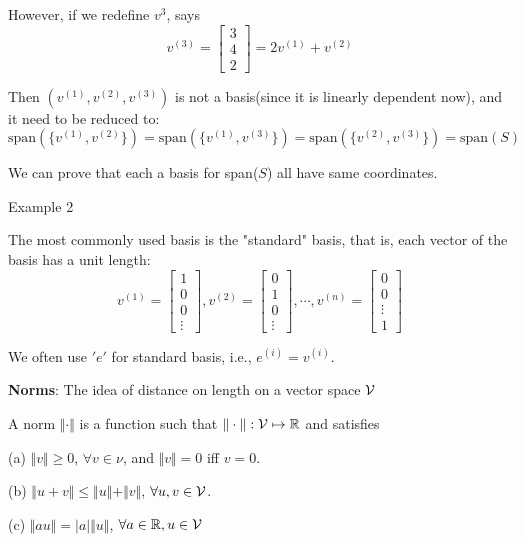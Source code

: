 However, if we redefine $v^{3}$, says
$$v^{(3)}= 
\left[ 
\begin{array}{c} 
3 \\
4 \\
2
\end{array}
\right]
=2v^{(1)}+v^{(2)}$$

Then $\left(v^{(1)},v^{(2)}, v^{(3)}\right)$ is not a basis(since it is linearly dependent now), and it need to be reduced to:
$$\text{span}\left(\{v^{(1)},v^{(2)}\}\right)=\text{span}\left(\{v^{(1)},v^{(3)}\}\right)=\text{span}\left(\{v^{(2)},v^{(3)}\}\right)=\text{span}(S)$$

We can prove that each a basis for span($S$) all have same coordinates.

\vspace{0.3cm}
Example 2

The most commonly used basis is the "standard" basis, that is, each vector of the basis has a unit length:
$$v^{(1)}= 
\left[ 
\begin{array}{c} 
1 \\
0 \\
0 \\
\vdots
\end{array}
\right],
v^{(2)}= 
\left[ 
\begin{array}{c} 
0 \\
1 \\
0 \\
\vdots
\end{array}
\right], \cdots,
v^{(n)}= 
\left[ 
\begin{array}{c} 
0 \\
0 \\
\vdots \\
1 
\end{array}
\right]$$

We often use $'e'$ for standard basis, i.e., $e^{(i)}=v^{(i)}$.

\vspace{0.5cm}
\noindent\textbf{Norms}: The idea of distance on length on a vector space $\cal{V}$

A norm $\Vert\cdot\Vert$ is a function such that $\Vert\cdot\Vert : \cal{V}\mapsto\mathbb{R}$
and satisfies

(a) $\Vert v \Vert\geq 0$, $\forall v\in \nu$, and $\Vert v \Vert=0$ iff $v=0$.

(b) $\Vert u+v \Vert\leq \Vert u \Vert+\Vert v \Vert$, $\forall u, v\in \cal{V}$.

(c) $\Vert au \Vert= \vert a\vert\Vert u \Vert$, $\forall a\in\mathbb{R}, u\in\cal{V}$

